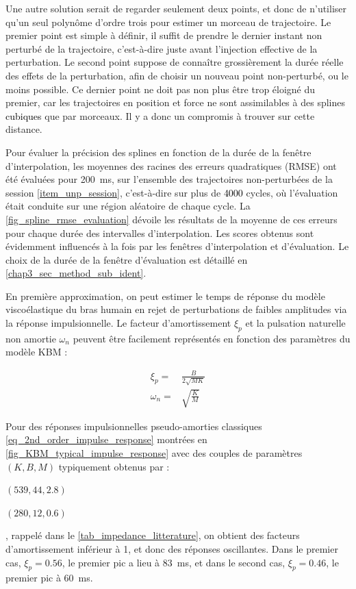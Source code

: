 Une autre solution serait de regarder seulement deux points, et donc de n'utiliser qu'un seul polynôme d'ordre trois pour estimer un morceau de trajectoire. Le premier point est simple à définir, il suffit de prendre le dernier instant non perturbé de la trajectoire, c'est-à-dire juste avant l'injection effective de la perturbation. Le second point suppose de connaître grossièrement la durée réelle des effets de la perturbation, afin de choisir un nouveau point non-perturbé, ou le moins possible. Ce dernier point ne doit pas non plus être trop éloigné du premier, car les trajectoires en position et force ne sont assimilables à des splines \textcolor{black}{cubiques} que par morceaux. Il y a donc un compromis à trouver sur cette distance.

Pour évaluer la précision des splines en fonction de la durée de la fenêtre d'interpolation, les moyennes des racines des erreurs quadratiques (RMSE) ont été évaluées pour \SI{200}{\milli\second}, sur l'ensemble des trajectoires non-perturbées de la session \cref{item_unp_session}, c'est-à-dire sur plus de \textcolor{black}{4000} cycles, où l'évaluation était conduite sur une région aléatoire de chaque cycle. La \cref{fig_spline_rmse_evaluation} dévoile les résultats de la moyenne de ces erreurs pour chaque durée des intervalles d'interpolation. Les scores obtenus sont évidemment influencés à la fois par les fenêtres d'interpolation et d'évaluation. Le choix de la durée de la fenêtre d'évaluation est détaillé en \cref{chap3_sec_method_sub_ident}.



En première approximation, on peut estimer le temps de réponse du modèle viscoélastique du bras humain en rejet de perturbations de faibles amplitudes via la réponse impulsionnelle. Le facteur d'amortissement $\xi_p$ et la pulsation naturelle non amortie $\omega_n$ peuvent être facilement représentés en fonction des paramètres du modèle KBM :

\begin{equation}
\begin{split}
\xi_p =& \frac{B}{2\sqrt{MK}} \\
\omega_n =& \sqrt{\frac{K}{M}}
\end{split}
\end{equation}

Pour des réponses impulsionnelles pseudo-amorties classiques \cref{eq_2nd_order_impulse_response} montrées en \cref{fig_KBM_typical_impulse_response} avec des couples de paramètres $(K,B,M)$ typiquement obtenus par \textcite{erden_hand_2015} : 
\begin{enumerate*}[label=(\alph*)]
	\item\label{item_model_a} $(539,44,2.8)$
	\item\label{item_model_b} $(280,12,0.6)$
\end{enumerate*}, rappelé dans le \cref{tab_impedance_litterature}, on obtient des facteurs d'amortissement inférieur à 1, et donc des réponses oscillantes. Dans le premier cas, $\xi_p=0.56$, le premier pic a lieu à \SI{83}{\milli\second}, et dans le second cas, $\xi_p=0.46$, le premier pic à \SI{60}{\milli\second}.

